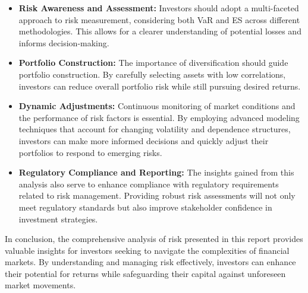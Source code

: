 \begin{itemize}
    \item \textbf{Risk Awareness and Assessment:} Investors should adopt a multi-faceted approach to risk measurement, considering both VaR and ES across different methodologies. This allows for a clearer understanding of potential losses and informs decision-making.
    \item \textbf{Portfolio Construction:} The importance of diversification should guide portfolio construction. By carefully selecting assets with low correlations, investors can reduce overall portfolio risk while still pursuing desired returns.
    \item \textbf{Dynamic Adjustments:} Continuous monitoring of market conditions and the performance of risk factors is essential. By employing advanced modeling techniques that account for changing volatility and dependence structures, investors can make more informed decisions and quickly adjust their portfolios to respond to emerging risks.
    \item \textbf{Regulatory Compliance and Reporting:} The insights gained from this analysis also serve to enhance compliance with regulatory requirements related to risk management. Providing robust risk assessments will not only meet regulatory standards but also improve stakeholder confidence in investment strategies.
\end{itemize}
In conclusion, the comprehensive analysis of risk presented in this report provides valuable insights for investors seeking to navigate the complexities of financial markets. By understanding and managing risk effectively, investors can enhance their potential for returns while safeguarding their capital against unforeseen market movements.